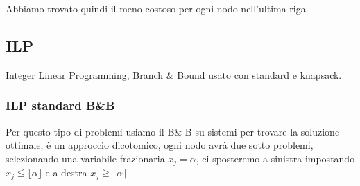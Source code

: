 \documentclass{article}
\begin{document}


Abbiamo trovato quindi il meno costoso per ogni nodo nell'ultima riga. 

\subsection{ILP}
Integer Linear Programming, Branch \& Bound usato con standard e knapsack. 
\subsubsection{ILP standard B\&B}
Per questo tipo di problemi usiamo il B\& B su sistemi per trovare la soluzione ottimale, è un approccio dicotomico, ogni nodo avrà due sotto problemi, selezionando una variabile frazionaria $x_j = \alpha$, ci sposteremo a sinistra impostando $x_j \leqq \lfloor \alpha \rfloor$ e a destra $x_j \geqq \lceil \alpha \rceil$\\

\begin{center}
\end{center}
\end{document}
